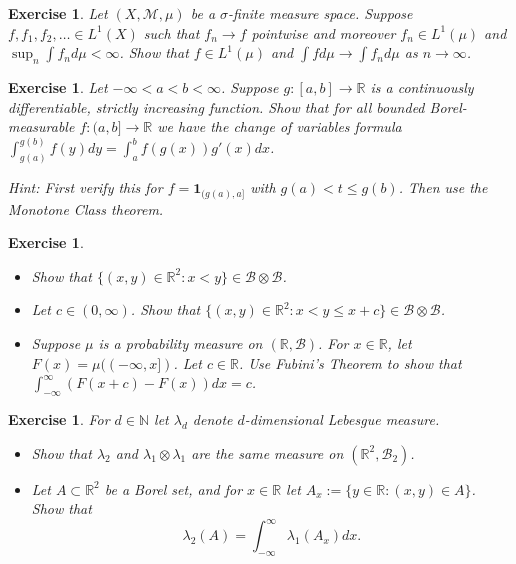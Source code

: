 \documentclass{article}
\newtheorem{exercise}[theorem]{Exercise}
\begin{document}
\begin{exercise}
Let \( (X, \mathcal{M}, \mu) \) be a \(\sigma\)-finite measure space. Suppose \( f, f_1, f_2, \dots \in L^1(X) \) such that \( f_n \to f \) pointwise and moreover \( f_n \in L^1(\mu) \) and \( \sup_n \int f_n d\mu < \infty \). Show that \( f \in L^1(\mu) \) and \( \int f d\mu \to \int f_n d\mu \) as \( n \to \infty \).
\end{exercise}

\begin{exercise}
Let $-\infty < a < b < \infty$. Suppose $g : [a, b] \to \mathbb{R}$ is a continuously differentiable, strictly increasing function. Show that for all bounded Borel-measurable $f : (a, b] \to \mathbb{R}$ we have the change of variables formula $\int_{g(a)}^{g(b)} f(y)dy = \int_{a}^{b} f(g(x))g'(x)dx$. 

\textit{Hint: First verify this for $f = \mathbf{1}_{(g(a),a]}$ with $g(a) < t \leq g(b)$. Then use the Monotone Class theorem.}
\end{exercise}
\bigskip

\begin{exercise}
\begin{itemize}
    \item[(a)] Show that $\{(x,y) \in \mathbb{R}^2 : x < y\} \in \mathcal{B} \otimes \mathcal{B}$.
    \item[(b)] Let $c \in (0,\infty)$. Show that $\{(x,y) \in \mathbb{R}^2 : x < y \leq x + c\} \in \mathcal{B} \otimes \mathcal{B}$.
    \item[(c)] Suppose $\mu$ is a probability measure on $(\mathbb{R}, \mathcal{B})$. For $x \in \mathbb{R}$, let $F(x) = \mu((-\infty, x])$. Let $c \in \mathbb{R}$. Use Fubini’s Theorem to show that $\int_{-\infty}^{\infty} (F(x+c) - F(x))dx = c$.
\end{itemize}
\end{exercise}

\begin{exercise}
For $d \in \mathbb{N}$ let $\lambda_d$ denote $d$-dimensional Lebesgue measure.
\begin{itemize}
    \item[(a)] Show that $\lambda_2$ and $\lambda_1 \otimes \lambda_1$ are the same measure on $(\mathbb{R}^2, \mathcal{B}_2)$.
    \item[(b)] Let $A \subset \mathbb{R}^2$ be a Borel set, and for $x \in \mathbb{R}$ let $A_x := \{y \in \mathbb{R} : (x, y) \in A\}$. Show that
    \[
    \lambda_2(A) = \int_{-\infty}^{\infty} \lambda_1(A_x)dx.
    \]
\end{itemize}
\end{exercise}
\end{document}
